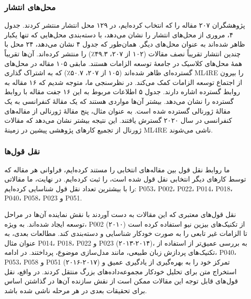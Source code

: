 \documentclass[a4paper,10pt]{article}
\begin{document}
            \subsubsection{محل‌های انتشار}

            
                پژوهشگران ۲۰۷ مقاله را که انتخاب کرده‌ایم، در ۱۲۹ محل انتشار منتشر کردند. جدول ۴، مروری از محل‌های انتشار را نشان می‌دهد، با دسته‌بندی محل‌هایی که تنها یکبار ظاهر شده‌اند به عنوان محل‌های دیگر. همان‌طور که جدول ۴ نشان می‌دهد، ۲۴ محل با چندین انتشار تقریباً نصف مقالات (۱۰۲ از ۲۰۷، ۴۹.۳٪) را منتشر کرده‌اند. آن‌ها تقریباً همهٔ محل‌های کلاسیک در جامعهٔ توسعه الزامات هستند. مابقی ۱۰۵ مقاله در محل‌های گسترده‌ای ظاهر شده‌اند (۱۰۵ از ۲۰۷، ۵۰.۷٪) که به اشتراک گذاری ML4RE را بیرون از اجتماع توسعه الزامات کمک می‌کند. در نظرسنجی ما، متوجه شدیم که ۱۶ مقاله به روابط گسترده اشاره دارند. جدول ۵ اطلاعات مربوط به این ۱۶ جفت مقاله با روابط گسترده را نشان می‌دهد. بیشتر آن‌ها مواردی هستند که یک مقالهٔ کنفرانسی به یک مقالهٔ ژورنالی گسترده شده است. به عنوان مثال، پنج مقالهٔ ژورنالی از مقاله‌های کنفرانسی در سال ۲۰۲۰ گسترش یافتند. این نتیجه بیشتر نشان می‌دهد که مقالات ژورنال از تجمیع کارهای پژوهشی پیشین در زمینهٔ ML4RE ناشی می‌شوند.
            
            \subsubsection{نقل قول‌ها}

                ما روابط نقل قول بین مقاله‌های انتخابی را مستند کرده‌ایم، فراوانی هر مقاله که توسط کارهای دیگر انتخابی نقل قول شده است، را ثبت کرده‌ایم. در نهایت، ما مقالاتی را با بیشترین تعداد نقل قول شناسایی کرده‌ایم: P053، P002، P022، P014، P018، P040، P058، P023 و P051.

                نقل قول‌های معتبری که این مقالات به دست آوردند با نقش نماینده آن‌ها در مراحل توسعه ایجاد شده‌اند. به ویژه، P002 (۲۰۱۰) از تکنیک‌های بیزین نیو استفاده کرده است تا الزامات غیر تابعی را به صورت خودکار شناسایی و دسته‌بندی کند. مطالعات بعدی، به عنوان مثال P014، P018، P022 و P023 (۲۰۱۳-۲۰۱۴)، به بررسی عمیق‌تر از استفاده از تکنیک‌های پردازش زبان طبیعی، مانند مدل‌سازی موضوع، پرداختند. در ادامه، P040، P053، P058 و P051 (۲۰۱۶-۲۰۱۷) تمرکز خود را به بهره‌گیری از یادگیری عمیق و استخراج متن برای تحلیل خودکار مجموعه‌داده‌های بزرگ منتقل کردند. در واقع، نقل قول‌های قابل توجه این مقالات ممکن است از نقش سازنده آن‌ها در گذاشتن اساس برای تحقیقات بعدی در هر مرحله ناشی شده باشد.
\end{document}
